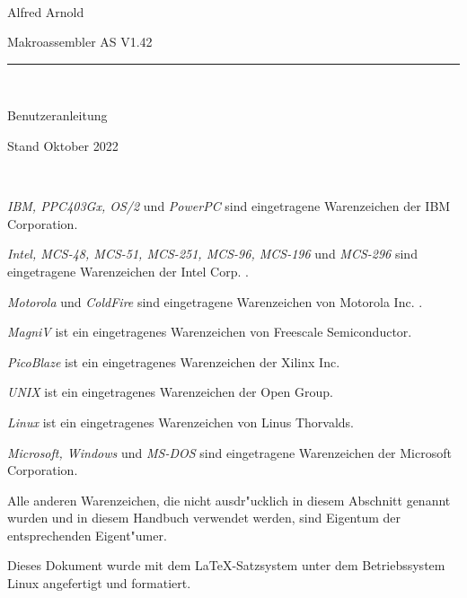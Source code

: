\documentclass[12pt,a4paper,twoside]{report}
\begin{document}
\thispagestyle{empty}

\
\vspace{7cm}\par

\begin{raggedright}
{\large Alfred Arnold}\\
\vspace{1cm}\par
{\huge Makroassembler AS V1.42}\\
\rule{9.5cm}{0.3mm}\\
\vspace{2mm}\par
{\huge Benutzeranleitung}

\vspace{1cm}\par

{\large Stand Oktober 2022}
\end{raggedright}

\clearpage
\thispagestyle{empty}

\ \vspace{4cm}

{\em IBM, PPC403Gx, OS/2} und {\em PowerPC} sind eingetragene Warenzeichen
der IBM Corporation.

{\em Intel, MCS-48, MCS-51, MCS-251, MCS-96, MCS-196} und {\em MCS-296}
sind eingetragene Warenzeichen der Intel Corp. .

{\em Motorola} und {\em ColdFire} sind eingetragene Warenzeichen von
Motorola Inc. .

{\em MagniV} ist ein eingetragenes Warenzeichen von Freescale Semiconductor.

{\em PicoBlaze} ist ein eingetragenes Warenzeichen der Xilinx Inc.

{\em UNIX} ist ein eingetragenes Warenzeichen der Open Group.

{\em Linux} ist ein eingetragenes Warenzeichen von Linus Thorvalds.

{\em Microsoft, Windows} und {\em MS-DOS} sind eingetragene Warenzeichen
der Microsoft Corporation.

Alle anderen Warenzeichen, die nicht ausdr"ucklich in diesem Abschnitt
genannt wurden und in diesem Handbuch verwendet werden, sind Eigentum
der entsprechenden Eigent"umer.

\vspace{6cm}

Dieses Dokument wurde mit dem LaTeX-Satzsystem unter dem Betriebssystem
Linux angefertigt und formatiert.
\end{document}
